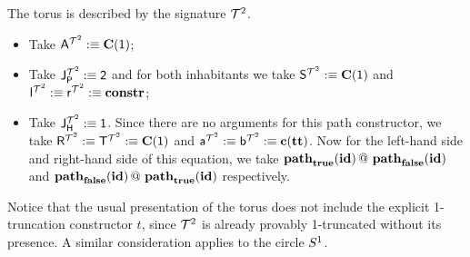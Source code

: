 \begin{example}
\label{ex:torus}
The torus is described by the signature $\torus$.
\begin{itemize}
	\item Take $\pointconstr[\torus] \eqdef \constantP{\unit}$;
	\item Take $\pathlabel[\torus] \eqdef \bool$ and for both inhabitants we take $\patharg[\torus] \eqdef \constantP{\unit}$ and $\pathleft[\torus] \eqdef \pathright[\torus] \eqdef \constr$;
	\item Take $\homotlabel[\torus] \eqdef \unit$.
	Since there are no arguments for this path constructor, we take $\homotpointarg[\torus] \eqdef \homotpathtarg[\torus] \eqdef \constantP{\unit}$ and $\pathargleft[\torus] \eqdef \pathargright[\torus] \eqdef \Ce(\unitt)$.
	Now for the left-hand side and right-hand side of this equation, we take $\hconcat{\hconstr{\booltrue}{\idENA}}{\hconstr{\boolfalse}{\idENA}}$ and $\hconcat{\hconstr{\boolfalse}{\idENA}}{\hconstr{\booltrue}{\idENA}}$ respectively. 
\end{itemize}
Notice that the usual presentation of the torus does not include the
explicit 1-truncation constructor $t$, since $\torus$ is already provably
1-truncated without its presence. A similar consideration applies to
the circle $\circleS$.
\end{example}

